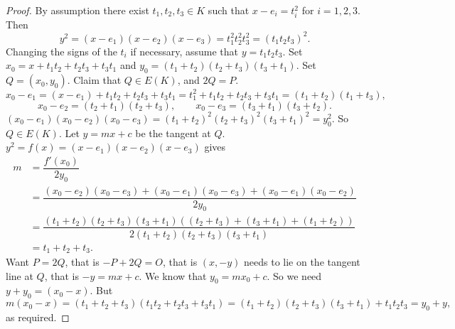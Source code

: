 \documentclass{article}
\newcommand{\rb}[1]{\left( #1 \right)}
\theoremstyle{definition}\newtheorem{definition}{Definition}[section]
\theoremstyle{definition}\newtheorem{remark}[definition]{Remark}
\theoremstyle{definition}\newtheorem*{example}{Example}
\theoremstyle{definition}\newtheorem*{note}{Note}
\begin{document}
\begin{proof}
By assumption there exist $ t_1, t_2, t_3 \in K $ such that $ x - e_i = t_i^2 $ for $ i = 1, 2, 3 $. Then
$$ y^2 = \rb{x - e_1}\rb{x - e_2}\rb{x - e_3} = t_1^2t_2^2t_3^2 = \rb{t_1t_2t_3}^2. $$
Changing the signs of the $ t_i $ if necessary, assume that $ y = t_1t_2t_3 $. Set $ x_0 = x + t_1t_2 + t_2t_3 + t_3t_1 $ and $ y_0 = \rb{t_1 + t_2}\rb{t_2 + t_3}\rb{t_3 + t_1} $. Set $ Q = \rb{x_0, y_0} $. Claim that $ Q \in E\rb{K} $, and $ 2Q = P $.
$$ x_0 - e_1 = \rb{x - e_1} + t_1t_2 + t_2t_3 + t_3t_1 = t_1^2 + t_1t_2 + t_2t_3 + t_3t_1 = \rb{t_1 + t_2}\rb{t_1 + t_3}, $$
$$ x_0 - e_2 = \rb{t_2 + t_1}\rb{t_2 + t_3}, \qquad x_0 - e_3 = \rb{t_3 + t_1}\rb{t_3 + t_2}. $$
$ \rb{x_0 - e_1}\rb{x_0 - e_2}\rb{x_0 - e_3} = \rb{t_1 + t_2}^2\rb{t_2 + t_3}^2\rb{t_3 + t_1}^2 = y_0^2 $. So $ Q \in E\rb{K} $. Let $ y = mx + c $ be the tangent at $ Q $. $ y^2 = f\rb{x} = \rb{x - e_1}\rb{x - e_2}\rb{x - e_3} $ gives
\begin{align*}
m
& = \dfrac{f'\rb{x_0}}{2y_0} \\
& = \dfrac{\rb{x_0 - e_2}\rb{x_0 - e_3} + \rb{x_0 - e_1}\rb{x_0 - e_3} + \rb{x_0 - e_1}\rb{x_0 - e_2}}{2y_0} \\
& = \dfrac{\rb{t_1 + t_2}\rb{t_2 + t_3}\rb{t_3 + t_1}\rb{\rb{t_2 + t_3} + \rb{t_3 + t_1} + \rb{t_1 + t_2}}}{2\rb{t_1 + t_2}\rb{t_2 + t_3}\rb{t_3 + t_1}} \\
& = t_1 + t_2 + t_3.
\end{align*}
Want $ P = 2Q $, that is $ -P + 2Q = O $, that is $ \rb{x, -y} $ needs to lie on the tangent line at $ Q $, that is $ -y = mx + c $. We know that $ y_0 = mx_0 + c $. So we need $ y + y_0 = \rb{x_0 - x} $. But
$$ m\rb{x_0 - x} = \rb{t_1 + t_2 + t_3}\rb{t_1t_2 + t_2t_3 + t_3t_1} = \rb{t_1 + t_2}\rb{t_2 + t_3}\rb{t_3 + t_1} + t_1t_2t_3 = y_0 + y, $$
as required.
\end{proof}
\end{document}
